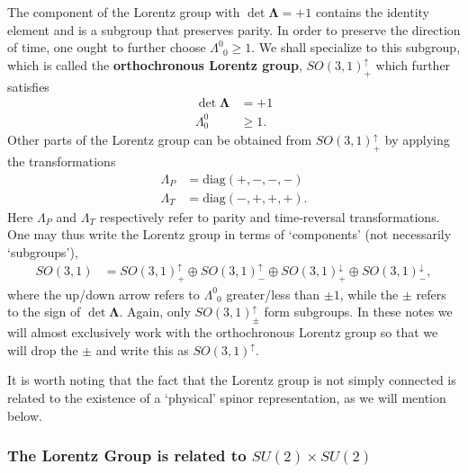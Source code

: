 \documentclass[12pt, oneside]{report}    %
\begin{document}
The component of the Lorentz group with $\det \mathbf\Lambda = +1$ contains the identity element and is a subgroup that preserves parity. In order to preserve the direction of time, one ought to further choose $\Lambda^0_{\phantom{0}0}\geq 1$. We shall specialize to this subgroup, which is called the \textbf{orthochronous Lorentz group}, $SO(3,1)^\uparrow_+$ which further satisfies 
\begin{align}
    \det \mathbf{\Lambda}&= +1\\
    \Lambda^0_0 &\geq 1.
\end{align}
Other parts of the Lorentz group can be obtained from $SO(3,1)^\uparrow_+$ by applying the transformations
\begin{align}
    \Lambda_P &= \text{diag}(+,-,-,-)\\
    \Lambda_T &= \text{diag}(-,+,+,+).
\end{align}
Here $\Lambda_P$ and $\Lambda_T$ respectively refer to parity and time-reversal transformations. One may thus write the Lorentz group in terms of `components' (not necessarily `subgroups'),
\begin{align}
    SO(3,1) &= SO(3,1)^\uparrow_+ \oplus SO(3,1)^\uparrow_- \oplus SO(3,1)^\downarrow_+ \oplus SO(3,1)^\downarrow_-,
\end{align}
where the up/down arrow refers to $\Lambda^0_{\phantom 00}$ greater/less than $\pm 1$, while the $\pm$ refers to the sign of $\det \mathbf\Lambda$. Again, only $SO(3,1)^\uparrow_\pm$ form subgroups. In these notes we will almost exclusively work with the orthochronous Lorentz group so that we will drop the $\pm$ and write this as $SO(3,1)^\uparrow$. 

It is worth noting that the fact that the Lorentz group is not simply connected is related to the existence of a `physical' spinor representation, as we will mention below.


\subsubsection{\texorpdfstring{The Lorentz Group is related to $SU(2) \times SU(2)$}{The Lorentz Group is related to SU(2)xSU(2)}}

\end{document}
